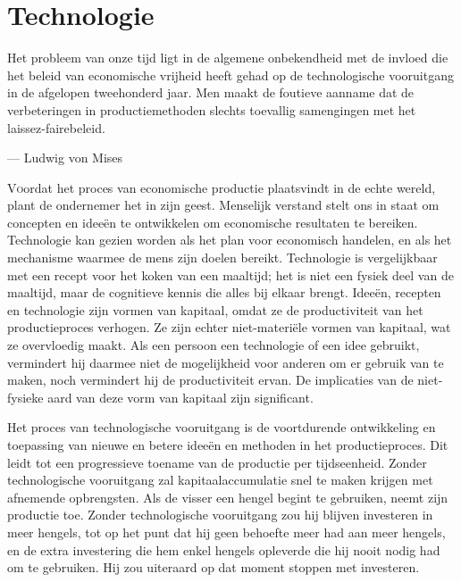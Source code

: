 \hypertarget{technologie}{%
\chapter{Technologie}\label{technologie}}

\vspace{-1em}
\begin{blockquotebox}
    Het probleem van onze tijd ligt in de algemene onbekendheid met de invloed die het beleid van economische vrijheid heeft gehad op de technologische vooruitgang in de afgelopen tweehonderd jaar. Men maakt de foutieve aanname dat de verbeteringen in productiemethoden slechts toevallig samengingen met het laissez-fairebeleid.\footnotemark
    \par\raggedleft--- Ludwig von Mises
\end{blockquotebox}

\vspace{-0.5em}
\lettrine{V}oordat het proces van economische productie plaatsvindt in de echte wereld, plant de ondernemer het in zijn geest. Menselijk verstand stelt ons in staat om concepten en ideeën te ontwikkelen om economische resultaten te bereiken. Technologie kan gezien worden als het plan voor economisch handelen, en als het mechanisme waarmee de mens zijn doelen bereikt. Technologie is vergelijkbaar met een recept voor het koken van een maaltijd; het is niet een fysiek deel van de maaltijd, maar de cognitieve kennis die alles bij elkaar brengt. Ideeën, recepten en technologie zijn vormen van kapitaal, omdat ze de productiviteit van het productieproces verhogen. Ze zijn echter niet-materiële vormen van kapitaal, wat ze overvloedig maakt. Als een persoon een technologie of een idee gebruikt, vermindert hij daarmee niet de mogelijkheid voor anderen om er gebruik van te maken, noch vermindert hij de productiviteit ervan. De implicaties van de niet-fysieke aard van deze vorm van kapitaal zijn significant.

Het proces van technologische vooruitgang is de voortdurende ontwikkeling en toepassing van nieuwe en betere ideeën en methoden in het productieproces. Dit leidt tot een progressieve toename van de productie per tijdseenheid. Zonder technologische vooruitgang zal kapitaalaccumulatie snel te maken krijgen met afnemende opbrengsten. Als de visser een hengel begint te gebruiken, neemt zijn productie toe. Zonder technologische vooruitgang zou hij blijven investeren in meer hengels, tot op het punt dat hij geen behoefte meer had aan meer hengels, en de extra investering die hem enkel hengels opleverde die hij nooit nodig had om te gebruiken. Hij zou uiteraard op dat moment stoppen met investeren.

